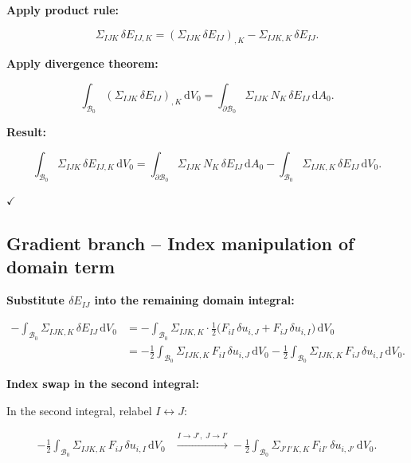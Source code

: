 \documentclass[11pt]{article}
\begin{document}
\textbf{Apply product rule:}

\begin{equation}
\Sigma_{IJK}\,\delta E_{IJ,K}
= (\Sigma_{IJK}\,\delta E_{IJ})_{,K}
- \Sigma_{IJK,K}\,\delta E_{IJ}.
\end{equation}

\textbf{Apply divergence theorem:}

\begin{equation}
\int_{\mathcal{B}_{0}}(\Sigma_{IJK}\,\delta E_{IJ})_{,K}\,
  \mathrm{d}V_{0}
= \int_{\partial\mathcal{B}_{0}}\Sigma_{IJK}\,N_{K}\,
  \delta E_{IJ}\,\mathrm{d}A_{0}.
\end{equation}

\textbf{Result:}

\begin{equation}
\int_{\mathcal{B}_{0}}\Sigma_{IJK}\,\delta E_{IJ,K}\,
  \mathrm{d}V_{0}
= \int_{\partial\mathcal{B}_{0}}\Sigma_{IJK}\,N_{K}\,
  \delta E_{IJ}\,\mathrm{d}A_{0}
- \int_{\mathcal{B}_{0}}\Sigma_{IJK,K}\,\delta E_{IJ}\,
  \mathrm{d}V_{0}.
\label{fd:ibp1}
\end{equation}

$\checkmark$

\subsection{Gradient branch -- Index manipulation of domain term}

\textbf{Substitute $\delta E_{IJ}$ into the remaining domain integral:}

\begin{align}
-\int_{\mathcal{B}_{0}}\Sigma_{IJK,K}\,\delta E_{IJ}\,
  \mathrm{d}V_{0}
&= -\int_{\mathcal{B}_{0}}\Sigma_{IJK,K}\cdot
   \tfrac12\bigl(F_{iI}\,\delta u_{i,J}
              + F_{iJ}\,\delta u_{i,I}\bigr)\,
  \mathrm{d}V_{0}
\nonumber\\
&= -\tfrac12\int_{\mathcal{B}_{0}}
   \Sigma_{IJK,K}\,F_{iI}\,\delta u_{i,J}\,
   \mathrm{d}V_{0}
 - \tfrac12\int_{\mathcal{B}_{0}}
   \Sigma_{IJK,K}\,F_{iJ}\,\delta u_{i,I}\,
   \mathrm{d}V_{0}.
\label{fd:two_terms}
\end{align}

\textbf{Index swap in the second integral:}

In the second integral, relabel $I\leftrightarrow J$:

\begin{align}
-\tfrac12\int_{\mathcal{B}_{0}}
   \Sigma_{IJK,K}\,F_{iJ}\,\delta u_{i,I}\,
   \mathrm{d}V_{0}
&\xrightarrow{I\to J',\;J\to I'}
-\tfrac12\int_{\mathcal{B}_{0}}
   \Sigma_{J'I'K,K}\,F_{iI'}\,\delta u_{i,J'}\,
   \mathrm{d}V_{0}.
\end{align}
\end{document}
